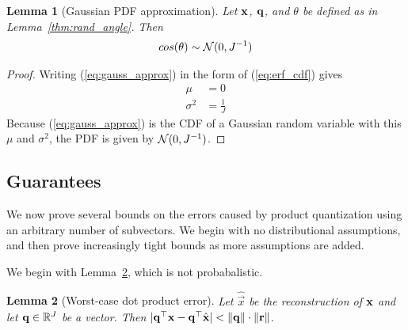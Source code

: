 \documentclass[]{article}
\newtheorem{lemma}{Lemma}[section]
\newtheorem{corollary}{Corrolary}[section]
\begin{document}
\begin{lemma}[Gaussian PDF approximation] \label{thm:gauss_pdf}
Let $\mathbf{x}$, $\mathbf{q}$, and $\theta$ be defined as in Lemma~\ref{thm:rand_angle}. Then
\begin{align} \label{eq:normal_approx_pdf}
    cos(\theta) \sim \operatorname{\mathcal{N}}(0, J^{-1})
\end{align}
\end{lemma}

\begin{proof} Writing (\ref{eq:gauss_approx}) in the form of (\ref{eq:erf_cdf}) gives
\begin{align}
    \mu &= 0 \\
    \sigma^2 &= \frac{1}{J}
\end{align}
Because (\ref{eq:gauss_approx}) is the CDF of a Gaussian random variable with this $\mu$ and $\sigma^2$, the PDF is given by $\operatorname{\mathcal{N}}(0, J^{-1})$.
\end{proof}


\subsection{Guarantees}%

We now prove several bounds on the errors caused by product quantization using an arbitrary number of subvectors. We begin with no distributional assumptions, and then prove increasingly tight bounds as more assumptions are added.

We begin with Lemma~\ref{thm:worst_dotprod}, which is not probabalistic.


\begin{lemma}[Worst-case dot product error] \label{thm:worst_dotprod}
Let $\hat{\vec{x}}$ be the reconstruction of $\mathbf{x}$ and let $\mathbf{q} \in \mathbb{R}^J$ be a vector. Then $\lvert\mathbf{q}^\top \mathbf{x} - \mathbf{q}^\top \hat{\mathbf{x}}\rvert < \lVert\mathbf{q}\rVert \cdot \lVert\mathbf{r}\rVert$.
\end{lemma}
\end{document}
